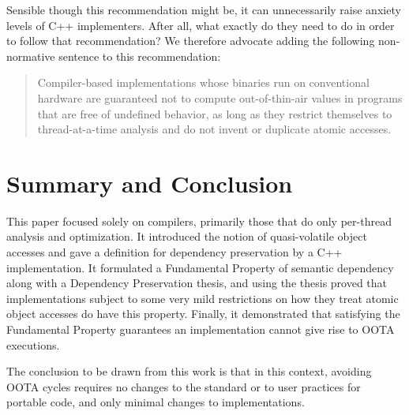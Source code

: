 Sensible though this recommendation might be, it can unnecessarily raise
anxiety levels of C++ implementers.
After all, what exactly do they need to do in order to follow that
recommendation?
We therefore advocate adding the following non-normative sentence to this
recommendation:
\begin{quote}
	Compiler-based implementations whose binaries run on conventional
	hardware are guaranteed not to compute out-of-thin-air values in
	programs that are free of undefined behavior,
	as long as they restrict themselves to thread-at-a-time analysis
	and do not invent or duplicate atomic accesses.
\end{quote}

\section{Summary and Conclusion}
\label{sec:Summary and Conclusion}

This paper focused solely on compilers, primarily those that do only
per-thread analysis and optimization.
It introduced the notion of quasi-volatile object accesses and gave
a definition for dependency preservation by a C++ implementation.
It formulated a Fundamental Property of semantic dependency along with
a Dependency Preservation thesis, and using the thesis proved
that implementations subject to some very mild restrictions on how
they treat atomic object accesses do have this property.
Finally, it demonstrated that satisfying the Fundamental Property
guarantees an implementation cannot give rise to OOTA executions.

The conclusion to be drawn from this work is that in this context,
avoiding OOTA cycles requires no changes to the standard
or to user practices for portable code, and only minimal changes to
implementations.




